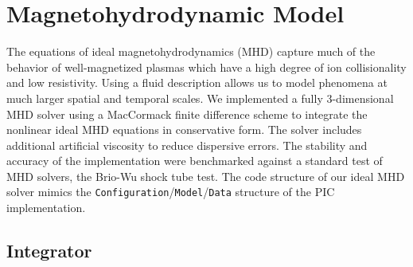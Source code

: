 \documentclass[%
 reprint,
 amsmath,amssymb,
 aps,
]{revtex4-2}
\begin{document}
\section{Magnetohydrodynamic Model}

The equations of ideal magnetohydrodynamics (MHD) capture much of the behavior of well-magnetized plasmas which have a high degree of ion collisionality and low resistivity. Using a fluid description allows us to model phenomena at much larger spatial and temporal scales. We implemented a fully 3-dimensional MHD solver using a MacCormack finite difference scheme to integrate the nonlinear ideal MHD equations in conservative form. The solver includes additional artificial viscosity to reduce dispersive errors. The stability and accuracy of the implementation were benchmarked against a standard test of MHD solvers, the Brio-Wu shock tube test. The code structure of our ideal MHD solver mimics the \texttt{Configuration}/\texttt{Model}/\texttt{Data} structure of the PIC implementation.

\subsection{Integrator}
\end{document}
